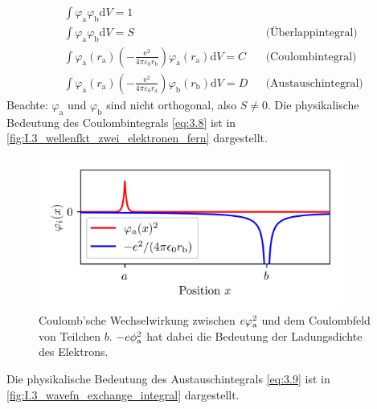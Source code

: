     \begin{align}
        \nonumber
        &\int \varphi_\text{a} \varphi_\text{b} \mathrm{d}V = 1\\
        \nonumber
        &\int \varphi_\text{a} \varphi_\text{b} \mathrm{d}V = S &&\text{(Überlappintegral)}\\
        \label{eq:3.8}
        &\int \varphi_\text{a} \left( r_\text{a} \right) \left( - \frac{\mathrm{e}^2}{4\pi \varepsilon_0 r_\text{b}}  \right) \varphi_\text{a}\left( r_\text{a} \right) \mathrm{d}V = C &&\text{(Coulombintegral)} \\
        \label{eq:3.9}
        &\int \varphi_\text{a} \left( r_\text{a} \right) \left( - \frac{\mathrm{e}^2}{4 \pi \varepsilon_0 r_\text{a}}  \right) \varphi_\text{b}\left( r_\text{b} \right) \mathrm{d}V = D &&\text{(Austauschintegral)}
    \end{align}
    Beachte: $ \varphi_\text{a}$ und $ \varphi_\text{b}$ sind nicht orthogonal, also $ S\neq 0$. 
    Die physikalische Bedeutung des Coulombintegrals \eqref{eq:3.8} ist in \autoref{fig:I.3_wellenfkt_zwei_elektronen_fern} dargestellt.\\
    
    \begin{figure}[H]
        \centering
        \includegraphics[width=10cm]{figures/vl04/wavefn_coulomb_integral.png}
        \caption{Coulomb'sche Wechselwirkung zwischen $e\varphi_\text a^2$ und dem Coulombfeld von Teilchen $b$. $-e\phi^2_\text a$ hat dabei die Bedeutung der Ladungsdichte des Elektrons.}
        \label{fig:I.3_wavefn_coulomb_integral}
    \end{figure}

    Die physikalische Bedeutung des Austauschintegrals \eqref{eq:3.9} ist in \autoref{fig:I.3_wavefn_exchange_integral} dargestellt.

